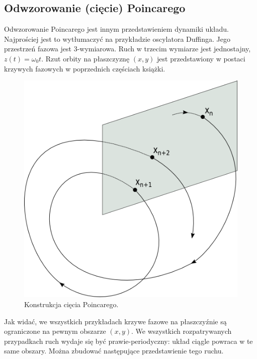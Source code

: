 \documentclass[a4paper,12pt,polish]{sphinxmanual}
\begin{document}
\subsection{Odwzorowanie (cięcie) Poincarego}
\label{ch2/chII012:odwzorowanie-ciecie-poincarego}
Odwzorowanie Poincarego jest innym przedstawieniem dynamiki układu.  Najprościej jest to wytłumaczyć na przykładzie oscylatora Duffinga. Jego przestrzeń fazowa jest 3-wymiarowa. Ruch w trzecim wymiarze jest jednostajny, $z(t) = \omega_0 t$. Rzut orbity na płaszczyznę  $(x, y)$ jest przedstawiony w postaci krzywych fazowych w poprzednich częściach książki.
\begin{figure}[htbp]
\centering
\capstart

\includegraphics{poincare_section.png}
\caption{Konstrukcja cięcia Poincarego.}\end{figure}

Jak widać, we wszystkich przykładach krzywe fazowe na płaszczyźnie są ograniczone na pewnym obszarze $(x, y)$. We wszystkich rozpatrywanych przypadkach ruch wydaje się być prawie-periodyczny: układ ciągle  powraca w te same obszary. Można zbudować następujące przedstawienie tego ruchu.
\end{document}
